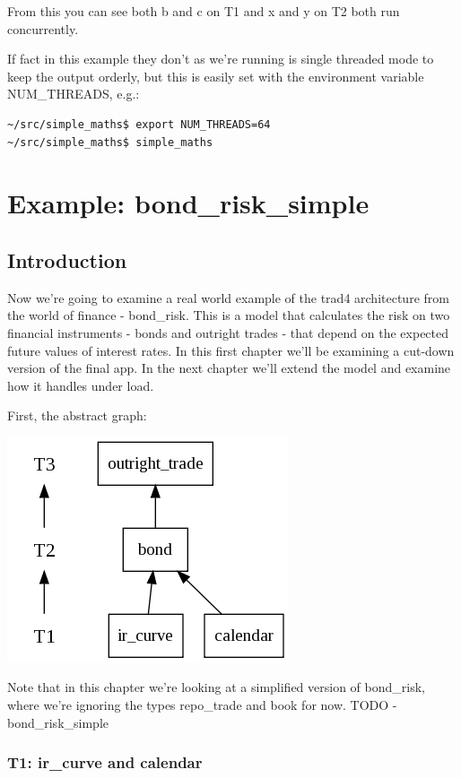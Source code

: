 \documentclass{report}
\begin{document}
From this you can see both b and c on T1 and x and y on T2 both run concurrently. 

If fact in this example they don't as we're running is single threaded mode to keep the output orderly, but this is easily set with the environment variable NUM_THREADS, e.g.:

\begin{verbatim}
~/src/simple_maths$ export NUM_THREADS=64
~/src/simple_maths$ simple_maths
\end{verbatim}

\chapter{Example: bond_risk_simple}

\section{Introduction}

Now we're going to examine a real world example of the trad4 architecture from the world of finance - bond_risk. This is a model that calculates the risk on two financial instruments - bonds and outright trades - that depend on the expected future values of interest rates. In this first chapter we'll be examining a cut-down version of the final app. In the next chapter we'll extend the model and examine how it handles under load.

First, the abstract graph:

\includegraphics[scale=0.5]{bondrisksimpleabstract.png}

Note that in this chapter we're looking at a simplified version of bond_risk, where we're ignoring the types repo_trade and book for now. TODO - bond_risk_simple

\subsection{T1: ir_curve and calendar}
\end{document}
